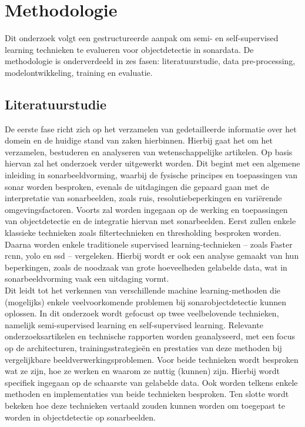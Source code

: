 
\chapter{Methodologie}%
\label{ch:methodologie}

Dit onderzoek volgt een gestructureerde aanpak om semi- en self-supervised learning technieken te evalueren voor objectdetectie in sonardata. De methodologie is onderverdeeld in zes fasen: literatuurstudie, data pre-processing, modelontwikkeling, training en evaluatie.

\section{Literatuurstudie}

De eerste fase richt zich op het verzamelen van gedetailleerde informatie over het domein en de huidige stand van zaken hierbinnen. Hierbij gaat het om het verzamelen, bestuderen en analyseren van wetenschappelijke artikelen. Op basis hiervan zal het onderzoek verder uitgewerkt worden. Dit begint met een algemene inleiding in sonarbeeldvorming, waarbij de fysische principes en toepassingen van sonar worden besproken, evenals de uitdagingen die gepaard gaan met de interpretatie van sonarbeelden, zoals ruis, resolutiebeperkingen en variërende omgevingsfactoren. Voorts zal worden ingegaan op de werking en toepassingen van objectdetectie en de integratie hiervan met sonarbeelden. Eerst zullen enkele klassieke technieken zoals filtertechnieken en thresholding besproken worden. Daarna worden enkele traditionele supervised learning-technieken -- zoals Faster \gls{rcnn}, \gls{yolo} en \gls{ssd} -- vergeleken. Hierbij wordt er ook een analyse gemaakt van hun beperkingen, zoals de noodzaak van grote hoeveelheden gelabelde data, wat in sonarbeeldvorming vaak een uitdaging vormt. \\

Dit leidt tot het verkennen van verschillende machine learning-methoden die (mogelijks) enkele veelvoorkomende problemen bij sonarobjectdetectie kunnen oplossen. In dit onderzoek wordt gefocust op twee veelbelovende technieken, namelijk semi-supervised learning en self-supervised learning. Relevante onderzoeksartikelen en technische rapporten worden geanalyseerd, met een focus op de architecturen, trainingsstrategieën en prestaties van deze methoden bij vergelijkbare beeldverwerkingsproblemen. Voor beide technieken wordt besproken wat ze zijn, hoe ze werken en waarom ze nuttig (kunnen) zijn. Hierbij wordt specifiek ingegaan op de schaarste van gelabelde data. Ook worden telkens enkele methoden en implementaties van beide technieken besproken. Ten slotte wordt bekeken hoe deze technieken vertaald zouden kunnen worden om toegepast te worden in objectdetectie op sonarbeelden. \\


